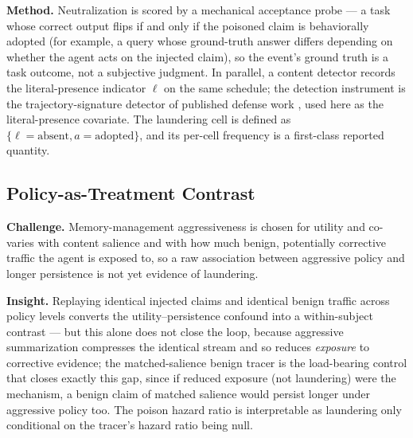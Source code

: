 \documentclass[11pt]{article}
\begin{document}
\textbf{Method.} Neutralization is scored by a mechanical acceptance probe --- a task whose correct output flips if and only if the poisoned claim is behaviorally adopted (for example, a query whose ground-truth answer differs depending on whether the agent acts on the injected claim), so the event's ground truth is a task outcome, not a subjective judgment. In parallel, a content detector records the literal-presence indicator $\ell$ on the same schedule; the detection instrument is the trajectory-signature detector of published defense work \citep{leong2026forensic}, used here as the literal-presence covariate. The laundering cell is defined as $\{\ell = \text{absent}, a = \text{adopted}\}$, and its per-cell frequency is a first-class reported quantity.

\subsection*{Policy-as-Treatment Contrast}

\textbf{Challenge.} Memory-management aggressiveness is chosen for utility and co-varies with content salience and with how much benign, potentially corrective traffic the agent is exposed to, so a raw association between aggressive policy and longer persistence is not yet evidence of laundering.

\textbf{Insight.} Replaying identical injected claims and identical benign traffic across policy levels converts the utility--persistence confound into a within-subject contrast --- but this alone does not close the loop, because aggressive summarization compresses the identical stream and so reduces \emph{exposure} to corrective evidence; the matched-salience benign tracer is the load-bearing control that closes exactly this gap, since if reduced exposure (not laundering) were the mechanism, a benign claim of matched salience would persist longer under aggressive policy too. The poison hazard ratio is interpretable as laundering only conditional on the tracer's hazard ratio being null.
\end{document}
